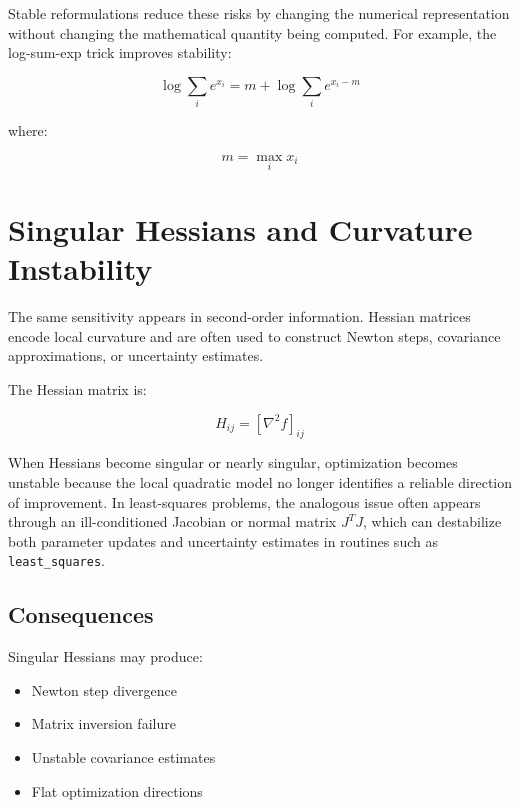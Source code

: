 Stable reformulations reduce these risks by changing the numerical representation without changing the mathematical quantity being computed. For example, the log-sum-exp trick improves stability:

\begin{equation}
\log \sum_i e^{x_i}
=
m + \log \sum_i e^{x_i-m}
\end{equation}

where:

\begin{equation}
m = \max_i x_i
\end{equation}

\section{Singular Hessians and Curvature Instability}

The same sensitivity appears in second-order information. Hessian matrices encode local curvature and are often used to construct Newton steps, covariance approximations, or uncertainty estimates.

The Hessian matrix is:

\begin{equation}
H_{ij} = \left[\nabla^2 f\right]_{ij}
\end{equation}

When Hessians become singular or nearly singular, optimization becomes unstable because the local quadratic model no longer identifies a reliable direction of improvement. In least-squares problems, the analogous issue often appears through an ill-conditioned Jacobian or normal matrix $J^T J$, which can destabilize both parameter updates and uncertainty estimates in routines such as \texttt{least\_squares}.

\subsection{Consequences}

Singular Hessians may produce:

\begin{itemize}
    \item Newton step divergence
    \item Matrix inversion failure
    \item Unstable covariance estimates
    \item Flat optimization directions
\end{itemize}

